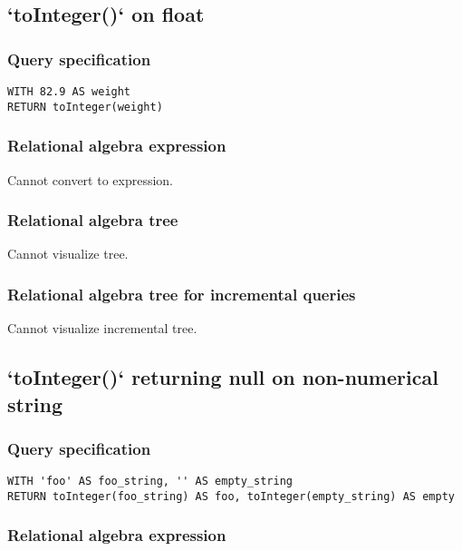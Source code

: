 \subsection{`toInteger()` on float}

\subsubsection*{Query specification}

\begin{lstlisting}
WITH 82.9 AS weight
RETURN toInteger(weight)
\end{lstlisting}

\subsubsection*{Relational algebra expression}

Cannot convert to expression.

\subsubsection*{Relational algebra tree}

Cannot visualize tree.

\subsubsection*{Relational algebra tree for incremental queries}

Cannot visualize incremental tree.

\subsection{`toInteger()` returning null on non-numerical string}

\subsubsection*{Query specification}

\begin{lstlisting}
WITH 'foo' AS foo_string, '' AS empty_string
RETURN toInteger(foo_string) AS foo, toInteger(empty_string) AS empty
\end{lstlisting}

\subsubsection*{Relational algebra expression}

